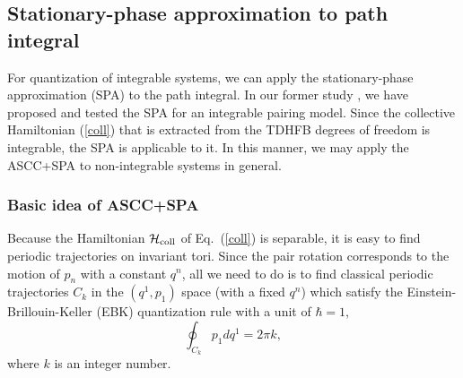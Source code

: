 \documentclass[11pt]{book} %
\begin{document}


\subsection{Stationary-phase approximation to path integral}
\label{sec:SPA}

For quantization of integrable systems,
we can apply the stationary-phase approximation (SPA)
to the path integral.
In our former study \cite{NN18},
we have proposed and tested the SPA for an integrable pairing model.
Since the collective Hamiltonian (\ref{coll}) that is
extracted from the TDHFB degrees of freedom is integrable,
the SPA is applicable to it.
In this manner, we may apply the ASCC+SPA to
non-integrable systems in general.


\subsubsection{Basic idea of ASCC+SPA}

Because the Hamiltonian $\mathcal{H}_{\rm coll}$ of Eq.~(\ref{coll})
is separable,
it is easy to find periodic trajectories on invariant tori.
Since the pair rotation corresponds to the motion of $p_n$
with a constant $q^n$,
all we need to do is to find classical periodic trajectories $C_k$ in
the $(q^1,p_1)$ space (with a fixed $q^n$) which satisfy
the Einstein-Brillouin-Keller (EBK) quantization rule
with a unit of $\hbar=1$,
\begin{equation}
	\oint_{C_k} p_1dq^1 = 2\pi k ,
	\label{EBK}
\end{equation}
where $k$ is an integer number.
\end{document}
